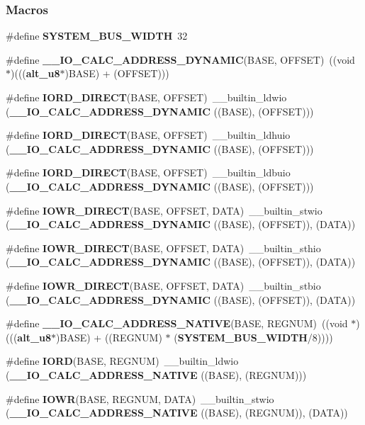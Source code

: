 \subsubsection*{Macros}
\begin{DoxyCompactItemize}
\item 
\#define {\bf S\+Y\+S\+T\+E\+M\+\_\+\+B\+U\+S\+\_\+\+W\+I\+D\+TH}~32
\item 
\#define {\bf \+\_\+\+\_\+\+I\+O\+\_\+\+C\+A\+L\+C\+\_\+\+A\+D\+D\+R\+E\+S\+S\+\_\+\+D\+Y\+N\+A\+M\+IC}(B\+A\+SE,  O\+F\+F\+S\+ET)~((void $\ast$)((({\bf alt\+\_\+u8}$\ast$)B\+A\+SE) + (O\+F\+F\+S\+ET)))
\item 
\#define {\bf I\+O\+R\+D\+\_\+D\+I\+R\+E\+CT}(B\+A\+SE,  O\+F\+F\+S\+ET)~\+\_\+\+\_\+builtin\+\_\+ldwio ({\bf \+\_\+\+\_\+\+I\+O\+\_\+\+C\+A\+L\+C\+\_\+\+A\+D\+D\+R\+E\+S\+S\+\_\+\+D\+Y\+N\+A\+M\+IC} ((B\+A\+SE), (O\+F\+F\+S\+ET)))
\item 
\#define {\bf I\+O\+R\+D\+\_\+D\+I\+R\+E\+CT}(B\+A\+SE,  O\+F\+F\+S\+ET)~\+\_\+\+\_\+builtin\+\_\+ldhuio ({\bf \+\_\+\+\_\+\+I\+O\+\_\+\+C\+A\+L\+C\+\_\+\+A\+D\+D\+R\+E\+S\+S\+\_\+\+D\+Y\+N\+A\+M\+IC} ((B\+A\+SE), (O\+F\+F\+S\+ET)))
\item 
\#define {\bf I\+O\+R\+D\+\_\+D\+I\+R\+E\+CT}(B\+A\+SE,  O\+F\+F\+S\+ET)~\+\_\+\+\_\+builtin\+\_\+ldbuio ({\bf \+\_\+\+\_\+\+I\+O\+\_\+\+C\+A\+L\+C\+\_\+\+A\+D\+D\+R\+E\+S\+S\+\_\+\+D\+Y\+N\+A\+M\+IC} ((B\+A\+SE), (O\+F\+F\+S\+ET)))
\item 
\#define {\bf I\+O\+W\+R\+\_\+D\+I\+R\+E\+CT}(B\+A\+SE,  O\+F\+F\+S\+ET,  D\+A\+TA)~\+\_\+\+\_\+builtin\+\_\+stwio ({\bf \+\_\+\+\_\+\+I\+O\+\_\+\+C\+A\+L\+C\+\_\+\+A\+D\+D\+R\+E\+S\+S\+\_\+\+D\+Y\+N\+A\+M\+IC} ((B\+A\+SE), (O\+F\+F\+S\+ET)), (D\+A\+TA))
\item 
\#define {\bf I\+O\+W\+R\+\_\+D\+I\+R\+E\+CT}(B\+A\+SE,  O\+F\+F\+S\+ET,  D\+A\+TA)~\+\_\+\+\_\+builtin\+\_\+sthio ({\bf \+\_\+\+\_\+\+I\+O\+\_\+\+C\+A\+L\+C\+\_\+\+A\+D\+D\+R\+E\+S\+S\+\_\+\+D\+Y\+N\+A\+M\+IC} ((B\+A\+SE), (O\+F\+F\+S\+ET)), (D\+A\+TA))
\item 
\#define {\bf I\+O\+W\+R\+\_\+D\+I\+R\+E\+CT}(B\+A\+SE,  O\+F\+F\+S\+ET,  D\+A\+TA)~\+\_\+\+\_\+builtin\+\_\+stbio ({\bf \+\_\+\+\_\+\+I\+O\+\_\+\+C\+A\+L\+C\+\_\+\+A\+D\+D\+R\+E\+S\+S\+\_\+\+D\+Y\+N\+A\+M\+IC} ((B\+A\+SE), (O\+F\+F\+S\+ET)), (D\+A\+TA))
\item 
\#define {\bf \+\_\+\+\_\+\+I\+O\+\_\+\+C\+A\+L\+C\+\_\+\+A\+D\+D\+R\+E\+S\+S\+\_\+\+N\+A\+T\+I\+VE}(B\+A\+SE,  R\+E\+G\+N\+UM)~((void $\ast$)((({\bf alt\+\_\+u8}$\ast$)B\+A\+SE) + ((R\+E\+G\+N\+UM) $\ast$ ({\bf S\+Y\+S\+T\+E\+M\+\_\+\+B\+U\+S\+\_\+\+W\+I\+D\+TH}/8))))
\item 
\#define {\bf I\+O\+RD}(B\+A\+SE,  R\+E\+G\+N\+UM)~\+\_\+\+\_\+builtin\+\_\+ldwio ({\bf \+\_\+\+\_\+\+I\+O\+\_\+\+C\+A\+L\+C\+\_\+\+A\+D\+D\+R\+E\+S\+S\+\_\+\+N\+A\+T\+I\+VE} ((B\+A\+SE), (R\+E\+G\+N\+UM)))
\item 
\#define {\bf I\+O\+WR}(B\+A\+SE,  R\+E\+G\+N\+UM,  D\+A\+TA)~\+\_\+\+\_\+builtin\+\_\+stwio ({\bf \+\_\+\+\_\+\+I\+O\+\_\+\+C\+A\+L\+C\+\_\+\+A\+D\+D\+R\+E\+S\+S\+\_\+\+N\+A\+T\+I\+VE} ((B\+A\+SE), (R\+E\+G\+N\+UM)), (D\+A\+TA))
\end{DoxyCompactItemize}



